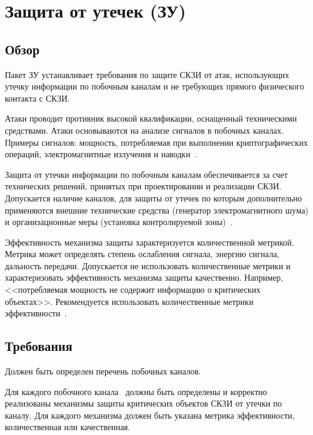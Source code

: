 \section{Защита от утечек (ЗУ)}\label{NI}

\subsection{Обзор}\label{NI.Intro}

Пакет ЗУ устанавливает требования по защите СКЗИ от атак, использующих утечку
информации по побочным каналам и не требующих прямого физического контакта с
СКЗИ.

Атаки проводит противник высокой квалификации, оснащенный 
техническими средствами. 
%
Атаки основываются на анализе сигналов в побочных каналах.
%
Примеры сигналов: мощность, потребляемая при выполнении криптографических
операций, электромагнитные излучения и наводки~.

Защита от утечки информации по побочным каналам обеспечивается за счет
технических решений, принятых при проектировании и реализации СКЗИ. Допускается
наличие каналов, для защиты от утечек по которым дополнительно применяются
внешние технические средства (генератор электромагнитного шума) и
организационные меры (установка контролируемой
зоны)~.

Эффективность механизма защиты характеризуется количественной метрикой.
Метрика может определять степень ослабления сигнала, энергию сигнала, 
дальность передачи.
%
Допускается не использовать количественные метрики и характеризовать
эффективность механизма защиты качественно. Например, <<потребляемая мощность не
содержит информацию о критических объектах>>.
%
Рекомендуется использовать количественные метрики
эффективности~.

\subsection{Требования}\label{NI.Reqs}


\label{R.NI.Channels} %
Должен быть определен перечень побочных каналов. 


\label{R.NI.Protect} %
Для каждого побочного канала~
должны быть определены и корректно реализованы механизмы защиты 
критических объектов СКЗИ от утечки по каналу. 
%
Для каждого механизма должен быть указана метрика эффективности,
количественная или качественная.

